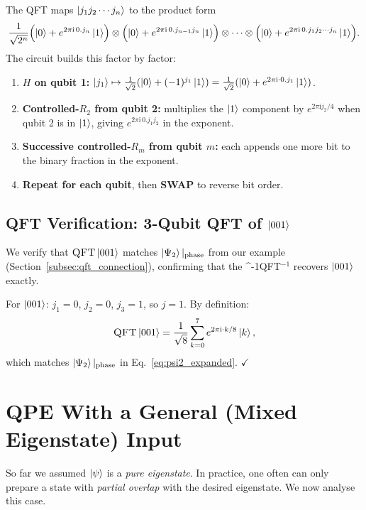 \documentclass[12pt,a4paper]{article}
\newcommand{\QFT}{\textsc{QFT}}
\newcommand{\IQFT}{\ifmmode \text{\textsc{QFT}}^{-1}\else \textsc{QFT}$^{-1}$\fi}
\newcommand{\ii}{\mathrm{i}}
\begin{document}
The QFT maps $\Ket{j_1 j_2 \cdots j_n}$ to the product form
\[
  \frac{1}{\sqrt{2^n}}
  \Bigl(\Ket{0}+e^{2\pi\ii\, 0.j_n}\Ket{1}\Bigr)
  \otimes
  \Bigl(\Ket{0}+e^{2\pi\ii\, 0.j_{n-1}j_n}\Ket{1}\Bigr)
  \otimes\cdots\otimes
  \Bigl(\Ket{0}+e^{2\pi\ii\, 0.j_1 j_2\cdots j_n}\Ket{1}\Bigr).
\]
The circuit builds this factor by factor:
\begin{enumerate}[leftmargin=*]
  \item \textbf{$H$ on qubit 1:}
    $\Ket{j_1} \mapsto \tfrac{1}{\sqrt{2}}(\Ket{0}+(-1)^{j_1}\Ket{1})
    = \tfrac{1}{\sqrt{2}}(\Ket{0}+e^{2\pi\ii\cdot 0.j_1}\Ket{1})$.
  \item \textbf{Controlled-$R_2$ from qubit 2:}
    multiplies the $\Ket{1}$ component by $e^{2\pi\ii j_2/4}$ when qubit 2 is in $\Ket{1}$,
    giving $e^{2\pi\ii\, 0.j_1 j_2}$ in the exponent.
  \item \textbf{Successive controlled-$R_m$ from qubit $m$:}
    each appends one more bit to the binary fraction in the exponent.
  \item \textbf{Repeat for each qubit}, then \textbf{SWAP} to reverse bit order.
\end{enumerate}

\subsection{QFT Verification: 3-Qubit QFT of \texorpdfstring{$\Ket{001}$}{|001>}}
\label{subsec:qft_example}

We verify that $\QFT\Ket{001}$ matches $\Ket{\Psi_2}|_\text{phase}$ from
our example (Section~\ref{subsec:qft_connection}), confirming that the \IQFT{}
recovers $\Ket{001}$ exactly.

For $\Ket{001}$: $j_1=0$, $j_2=0$, $j_3=1$, so $j = 1$.  By definition:
\[
  \QFT\Ket{001}
  = \frac{1}{\sqrt{8}}\sum_{k=0}^{7}e^{2\pi\ii\cdot k/8}\Ket{k},
\]
which matches $\Ket{\Psi_2}|_\text{phase}$ in Eq.~\eqref{eq:psi2_expanded}. $\checkmark$

\newpage

\section{QPE With a General (Mixed Eigenstate) Input}
\label{sec:general}

So far we assumed $\Ket{\psi}$ is a \emph{pure eigenstate}.  In practice,
one often can only prepare a state with \emph{partial overlap} with the
desired eigenstate.  We now analyse this case.
\end{document}
